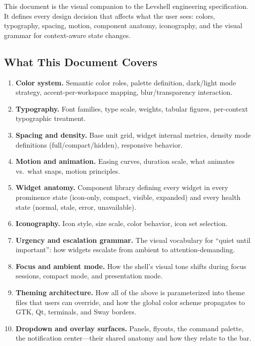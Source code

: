 \documentclass[11pt,a4paper]{article}
\begin{document}
This document is the visual companion to the Levshell engineering specification. It defines every design decision that affects what the user sees: colors, typography, spacing, motion, component anatomy, iconography, and the visual grammar for context-aware state changes.

\subsection{What This Document Covers}

\begin{enumerate}[leftmargin=1.5em, itemsep=3pt]
  \item \textbf{Color system.} Semantic color roles, palette definition, dark/light mode strategy, accent-per-workspace mapping, blur/transparency interaction.
  \item \textbf{Typography.} Font families, type scale, weights, tabular figures, per-context typographic treatment.
  \item \textbf{Spacing and density.} Base unit grid, widget internal metrics, density mode definitions (full/compact/hidden), responsive behavior.
  \item \textbf{Motion and animation.} Easing curves, duration scale, what animates vs.\ what snaps, motion principles.
  \item \textbf{Widget anatomy.} Component library defining every widget in every prominence state (icon-only, compact, visible, expanded) and every health state (normal, stale, error, unavailable).
  \item \textbf{Iconography.} Icon style, size scale, color behavior, icon set selection.
  \item \textbf{Urgency and escalation grammar.} The visual vocabulary for ``quiet until important'': how widgets escalate from ambient to attention-demanding.
  \item \textbf{Focus and ambient mode.} How the shell's visual tone shifts during focus sessions, compact mode, and presentation mode.
  \item \textbf{Theming architecture.} How all of the above is parameterized into theme files that users can override, and how the global color scheme propagates to GTK, Qt, terminals, and Sway borders.
  \item \textbf{Dropdown and overlay surfaces.} Panels, flyouts, the command palette, the notification center---their shared anatomy and how they relate to the bar.
\end{enumerate}
\end{document}
